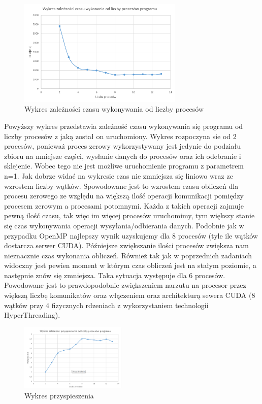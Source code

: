 \documentclass[a4paper,12pt]{article}
\begin{document}
\begin{figure}[!hbp]
	\centering
  \includegraphics[width=0.7\textwidth]{wykres.png}
  \caption{Wykres zależności czasu wykonywania od liczby procesów}
\end{figure}
Powyższy wykres przedstawia zależność czasu wykonywania się programu od liczby procesów z jaką został on uruchomiony. Wykres rozpoczyna sie od 2 procesów, ponieważ proces zerowy wykorzystywany jest jedynie do podziału zbioru na mniejsze części, wysłanie danych do procesów oraz ich odebranie i sklejenie. Wobec tego nie jest możliwe uruchomienie programu z parametrem n=1. Jak dobrze widać na wykresie czas nie zmniejsza się liniowo wraz ze wzrostem liczby wątków. Spowodowane jest to wzrostem czasu obliczeń dla procesu zerowego ze względu na większą ilość operacji komunikacji pomiędzy procesem zerowym a procesami potomnymi. Każda z takich operacji zajmuje pewną ilość czasu, tak więc im więcej procesów uruchomimy, tym większy stanie się czas wykonywania operacji wysyłania/odbierania danych. Podobnie jak w przypadku OpenMP najlepszy wynik uzyskujemy dla 8 procesów (tyle ile wątków dostarcza serwer CUDA). Późniejsze zwiększanie ilości procesów zwiększa nam nieznacznie czas wykonania obliczeń. Również tak jak w poprzednich zadaniach widoczny jest pewien moment w którym czas obliczeń jest na stałym poziomie, a następnie znów się zmniejsza. Taka sytuacja występuje dla 6 procesów. Powodowane jest to prawdopodobnie zwiększeniem narzutu na procesor przez większą liczbę komunikatów oraz włączeniem oraz architekturą sewera CUDA (8 wątków przy 4 fizycznych rdzeniach z wykorzystaniem technologii HyperThreading). 

\begin{figure}
  \vspace{-20pt}
  \begin{center}
  \includegraphics[width=0.45\textwidth]{wykres1.png}
  \end{center}
  \vspace{-20pt}
  \caption{Wykres przyspieszenia}
  \vspace{-10pt}
\end{figure}
\end{document}
